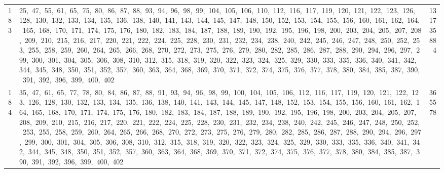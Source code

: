 \begin{longtable}{c|p{}|r}
183 & 25,\ 47,\ 55,\ 61,\ 65,\ 75,\ 80,\ 86,\ 87,\ 88,\ 93,\ 94,\ 96,\ 98,\ 99,\ 104,\ 105,\ 106,\ 110,\ 112,\ 116,\ 117,\ 119,\ 120,\ 121,\ 122,\ 123,\ 126,\ 128,\ 130,\ 132,\ 133,\ 134,\ 135,\ 136,\ 138,\ 140,\ 141,\ 143,\ 144,\ 145,\ 147,\ 148,\ 150,\ 152,\ 153,\ 154,\ 155,\ 156,\ 160,\ 161,\ 162,\ 164,\ 165,\ 168,\ 170,\ 171,\ 174,\ 175,\ 176,\ 180,\ 182,\ 183,\ 184,\ 187,\ 188,\ 189,\ 190,\ 192,\ 195,\ 196,\ 198,\ 200,\ 203,\ 204,\ 205,\ 207,\ 208,\ 209,\ 210,\ 215,\ 216,\ 217,\ 220,\ 221,\ 222,\ 224,\ 225,\ 228,\ 230,\ 231,\ 232,\ 234,\ 238,\ 240,\ 242,\ 245,\ 246,\ 247,\ 248,\ 250,\ 252,\ 253,\ 255,\ 258,\ 259,\ 260,\ 264,\ 265,\ 266,\ 268,\ 270,\ 272,\ 273,\ 275,\ 276,\ 279,\ 280,\ 282,\ 285,\ 286,\ 287,\ 288,\ 290,\ 294,\ 296,\ 297,\ 299,\ 300,\ 301,\ 304,\ 305,\ 306,\ 308,\ 310,\ 312,\ 315,\ 318,\ 319,\ 320,\ 322,\ 323,\ 324,\ 325,\ 329,\ 330,\ 333,\ 335,\ 336,\ 340,\ 341,\ 342,\ 344,\ 345,\ 348,\ 350,\ 351,\ 352,\ 357,\ 360,\ 363,\ 364,\ 368,\ 369,\ 370,\ 371,\ 372,\ 374,\ 375,\ 376,\ 377,\ 378,\ 380,\ 384,\ 385,\ 387,\ 390,\ 391,\ 392,\ 396,\ 399,\ 400,\ 402 & 131735884 \\
184 & 35,\ 47,\ 61,\ 65,\ 77,\ 78,\ 80,\ 84,\ 86,\ 87,\ 88,\ 91,\ 93,\ 94,\ 96,\ 98,\ 99,\ 100,\ 104,\ 105,\ 106,\ 112,\ 116,\ 117,\ 119,\ 120,\ 121,\ 122,\ 123,\ 126,\ 128,\ 130,\ 132,\ 133,\ 134,\ 135,\ 136,\ 138,\ 140,\ 141,\ 143,\ 144,\ 145,\ 147,\ 148,\ 152,\ 153,\ 154,\ 155,\ 156,\ 160,\ 161,\ 162,\ 164,\ 165,\ 168,\ 170,\ 171,\ 174,\ 175,\ 176,\ 180,\ 182,\ 183,\ 184,\ 187,\ 188,\ 189,\ 190,\ 192,\ 195,\ 196,\ 198,\ 200,\ 203,\ 204,\ 205,\ 207,\ 208,\ 209,\ 210,\ 215,\ 216,\ 217,\ 220,\ 221,\ 222,\ 224,\ 225,\ 228,\ 230,\ 231,\ 232,\ 234,\ 238,\ 240,\ 242,\ 245,\ 246,\ 247,\ 248,\ 250,\ 252,\ 253,\ 255,\ 258,\ 259,\ 260,\ 264,\ 265,\ 266,\ 268,\ 270,\ 272,\ 273,\ 275,\ 276,\ 279,\ 280,\ 282,\ 285,\ 286,\ 287,\ 288,\ 290,\ 294,\ 296,\ 297,\ 299,\ 300,\ 301,\ 304,\ 305,\ 306,\ 308,\ 310,\ 312,\ 315,\ 318,\ 319,\ 320,\ 322,\ 323,\ 324,\ 325,\ 329,\ 330,\ 333,\ 335,\ 336,\ 340,\ 341,\ 342,\ 344,\ 345,\ 348,\ 350,\ 351,\ 352,\ 357,\ 360,\ 363,\ 364,\ 368,\ 369,\ 370,\ 371,\ 372,\ 374,\ 375,\ 376,\ 377,\ 378,\ 380,\ 384,\ 385,\ 387,\ 390,\ 391,\ 392,\ 396,\ 399,\ 400,\ 402 & 365578 \\

\end{longtable}
